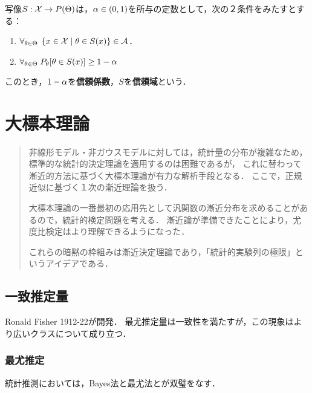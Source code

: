 \documentclass[uplatex,dvipdfmx]{jsreport}
\begin{document}
\begin{definition}
    写像$S:\mathcal{X}\to P(\Theta)$は，$\alpha\in(0,1)$を所与の定数として，次の２条件をみたすとする：
    \begin{enumerate}
        \item $\forall_{\theta\in\Theta}\;\left\{x\in\mathcal{X}\mid \theta\in S(x)\right\}\in\mathcal{A}$．
        \item $\forall_{\theta\in\Theta}\;P_\theta[\theta\in S(x)]\ge1-\alpha$
    \end{enumerate}
    このとき，$1-\alpha$を\textbf{信頼係数}，$S$を\textbf{信頼域}という．
\end{definition}

\chapter{大標本理論}

\begin{quotation}
    非線形モデル・非ガウスモデルに対しては，統計量の分布が複雑なため，標準的な統計的決定理論を適用するのは困難であるが，
    これに替わって漸近的方法に基づく大標本理論が有力な解析手段となる．
    ここで，正規近似に基づく１次の漸近理論を扱う．

    大標本理論の一番最初の応用先として汎関数の漸近分布を求めることがあるので，統計的検定問題を考える．
    漸近論が準備できたことにより，尤度比検定はより理解できるようになった．

    これらの暗黙の枠組みは漸近決定理論であり，「統計的実験列の極限」というアイデアである．
\end{quotation}

\section{一致推定量}

\begin{tcolorbox}[colframe=ForestGreen, colback=ForestGreen!10!white,breakable,colbacktitle=ForestGreen!40!white,coltitle=black,fonttitle=\bfseries\sffamily,
title=]
    Ronald Fisher 1912-22が開発．
    最尤推定量は一致性を満たすが，この現象はより広いクラスについて成り立つ．
\end{tcolorbox}

\subsection{最尤推定}

\begin{tcolorbox}[colframe=ForestGreen, colback=ForestGreen!10!white,breakable,colbacktitle=ForestGreen!40!white,coltitle=black,fonttitle=\bfseries\sffamily,
title=]
    統計推測においては，Bayes法と最尤法とが双璧をなす．
\end{tcolorbox}
\end{document}
